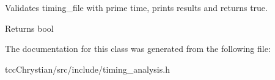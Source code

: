 Validates timing\-\_\-file with prime time, prints results and returns true. 

\begin{DoxyReturn}{Returns}
bool 
\end{DoxyReturn}


The documentation for this class was generated from the following file\-:\begin{DoxyCompactItemize}
\item 
tcc\-Chrystian/src/include/timing\-\_\-analysis.\-h\end{DoxyCompactItemize}
